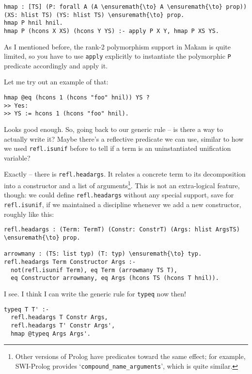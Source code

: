\begin{verbatim}
hmap : [TS] (P: forall A (A \ensuremath{\to} A \ensuremath{\to} prop)) (XS: hlist TS) (YS: hlist TS) \ensuremath{\to} prop.
hmap P hnil hnil.
hmap P (hcons X XS) (hcons Y YS) :- apply P X Y, hmap P XS YS.
\end{verbatim}

As I mentioned before, the rank-2 polymorphism support in Makam is quite
limited, so you have to use \texttt{apply} explicitly to instantiate the
polymorphic \texttt{P} predicate accordingly and apply it.

\heroSTUDENT{} Let me try out an example of that:

\begin{verbatim}
hmap @eq (hcons 1 (hcons "foo" hnil)) YS ?
>> Yes:
>> YS := hcons 1 (hcons "foo" hnil).
\end{verbatim}

Looks good enough. So, going back to our generic rule -- is there a way
to actually write it? Maybe there's a reflective predicate we can use,
similar to how we used \texttt{refl.isunif} before to tell if a term is
an uninstantiated unification variable?

\heroADVISOR{} Exactly -- there is \texttt{refl.headargs}. It relates a
concrete term to its decomposition into a constructor and a list of
arguments\footnote{Other versions of Prolog have predicates toward the same effect; for example, SWI-Prolog \citep{wielemaker2012swi} provides `\texttt{compound\_{}name\_{}arguments}', which is quite similar.}.
This is not an extra-logical feature, though: we could define
\texttt{refl.headargs} without any special support, save for
\texttt{refl.isunif}, if we maintained a discipline whenever we add a
new constructor, roughly like this:

\begin{verbatim}
refl.headargs : (Term: TermT) (Constr: ConstrT) (Args: hlist ArgsTS) \ensuremath{\to} prop.

arrowmany : (TS: list typ) (T: typ) \ensuremath{\to} typ.
refl.headargs Term Constructor Args :-
  not(refl.isunif Term), eq Term (arrowmany TS T),
  eq Constructor arrowmany, eq Args (hcons TS (hcons T hnil)).
\end{verbatim}

\heroSTUDENT{} I see. I think I can write the generic rule for \texttt{typeq}
now then!

\begin{verbatim}
typeq T T' :-
  refl.headargs T Constr Args,
  refl.headargs T' Constr Args',
  hmap @typeq Args Args'.
\end{verbatim}

